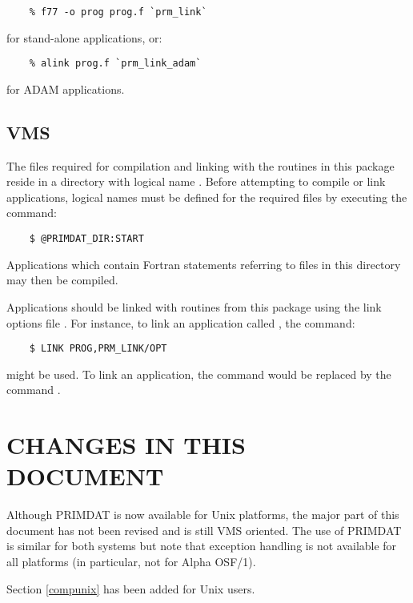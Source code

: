\begin{verbatim}
    % f77 -o prog prog.f `prm_link`
\end{verbatim}

for stand-alone applications, or:

\begin{verbatim}
    % alink prog.f `prm_link_adam`
\end{verbatim}

for ADAM applications.

\subsection{VMS}
The files required for compilation and linking with the routines in this
package reside in a directory with logical name . 
Before attempting to compile or link applications, logical names must be
defined for the required files by executing the  command:

\begin{verbatim}
    $ @PRIMDAT_DIR:START
\end{verbatim}

Applications which contain Fortran  statements referring to
files in this directory may then be compiled. 

Applications should be linked with routines from this package using the link
options file . 
For instance, to link an application called , the 
command: 

\begin{verbatim}
    $ LINK PROG,PRM_LINK/OPT
\end{verbatim}

might be used.
To link an  application, the  command would be
replaced by the  command . 

\section{CHANGES IN THIS DOCUMENT}
Although PRIMDAT is now available for Unix platforms, the major part of this
document has not been revised and is still VMS oriented. 
The use of PRIMDAT is similar for both systems but note that exception
handling is not available for all platforms (in particular, not for 
Alpha OSF/1).

Section \ref{compunix} has been added for Unix users.

\appendix


